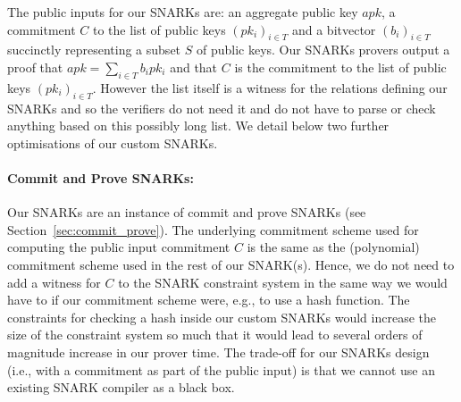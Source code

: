 \vspace{-0.05cm}
\noindent The public inputs for our SNARKs are: an aggregate public key $\mathit{apk}$, a commitment $C$ to the list of 
public keys $(pk_i)_{i \in T}$ and a bitvector $(b_i)_{i \in T}$ succinctly representing a subset $S$ of public keys. 
Our SNARKs provers output a proof that $apk=\sum_{i \in T} b_i pk_i$ and that $C$ is the commitment to the list of public keys 
$(pk_i)_{i \in T}$. However the list itself is a witness for the relations defining our SNARKs and so the verifiers do not need it 
and do not have to parse or check anything based on this possibly long list. 
We detail below two further optimisations of our custom SNARKs.

\vspace{-0.05in}
\paragraph{Commit and Prove SNARKs:} Our SNARKs are an instance of commit and prove SNARKs (see Section~\ref{sec:commit_prove}). 
The underlying commitment scheme used for computing the public input commitment $C$ is the same as the (polynomial) commitment scheme used in the rest of our SNARK(s). Hence, we do not need to add a witness for $C$ 
to the SNARK constraint system in the same way we would have to if our commitment scheme were, e.g., to use a hash function.
The constraints for checking a hash inside our custom SNARKs would increase the size of the constraint system so much that it would lead to several orders of magnitude increase in our prover time. 
The trade-off for our SNARKs design (i.e., with a commitment as part of the public input) is that we cannot use an existing SNARK compiler as a black box.

